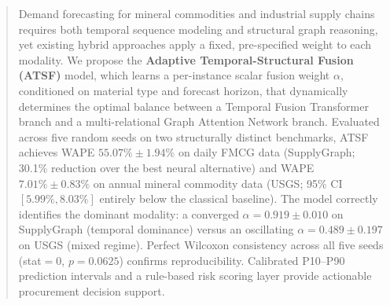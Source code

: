 
\begin{abstract}
Demand forecasting for mineral commodities and industrial supply
chains requires both temporal sequence modeling and structural
graph reasoning, yet existing hybrid approaches apply a fixed,
pre-specified weight to each modality. We propose the
\textbf{Adaptive Temporal-Structural Fusion (ATSF)} model, which
learns a per-instance scalar fusion weight $\alpha$, conditioned
on material type and forecast horizon, that dynamically determines
the optimal balance between a Temporal Fusion Transformer branch
and a multi-relational Graph Attention Network branch. Evaluated
across five random seeds on two structurally distinct benchmarks,
ATSF achieves WAPE $55.07\%{\pm}1.94\%$ on daily FMCG data
(SupplyGraph; 30.1\% reduction over the best neural alternative)
and WAPE $7.01\%{\pm}0.83\%$ on annual mineral commodity data
(USGS; 95\% CI $[5.99\%, 8.03\%]$ entirely below the classical
baseline). The model correctly identifies the dominant modality: a
converged $\alpha{=}0.919{\pm}0.010$ on SupplyGraph (temporal
dominance) versus an oscillating $\alpha{=}0.489{\pm}0.197$ on
USGS (mixed regime). Perfect Wilcoxon consistency across all five
seeds (stat$=0$, $p{=}0.0625$) confirms reproducibility.
Calibrated P10--P90 prediction intervals and a rule-based risk
scoring layer provide actionable procurement decision support.
\end{abstract}

